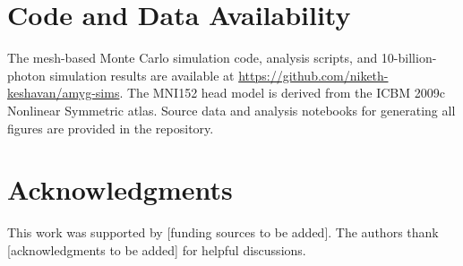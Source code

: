 \documentclass[11pt,a4paper]{article}
\begin{document}
\section*{Code and Data Availability}

The mesh-based Monte Carlo simulation code, analysis scripts, and 10-billion-photon simulation results are available at \url{https://github.com/niketh-keshavan/amyg-sims}. The MNI152 head model is derived from the ICBM 2009c Nonlinear Symmetric atlas\cite{fonov2011unbiased}. Source data and analysis notebooks for generating all figures are provided in the repository.


\section*{Acknowledgments}

This work was supported by [funding sources to be added]. The authors thank [acknowledgments to be added] for helpful discussions.




\end{document}
